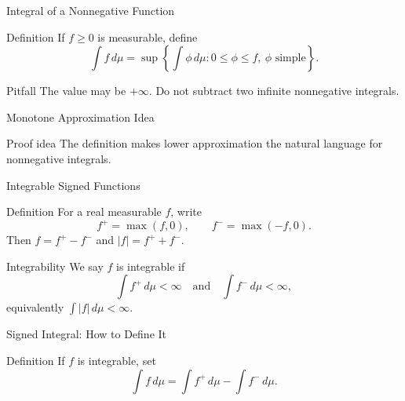\begin{frame}{Integral of a Nonnegative Function}
  \begin{block}{Definition}
    If $f\ge0$ is measurable, define
    \[
      \int f\,d\mu
      =
      \sup\left\{\int \phi\,d\mu:
      0\le \phi\le f,\ \phi\text{ simple}\right\}.
    \]
  \end{block}
  \begin{alertblock}{Pitfall}
    The value may be $+\infty$. Do not subtract two infinite nonnegative integrals.
  \end{alertblock}
\end{frame}

\begin{frame}{Monotone Approximation Idea}
  \begin{block}{Proof idea}
    The definition makes lower approximation the natural language for nonnegative integrals.
  \end{block}
\end{frame}

\begin{frame}{Integrable Signed Functions}
  \begin{block}{Definition}
    For a real measurable $f$, write
    \[
      f^+=\max(f,0),\qquad f^-=\max(-f,0).
    \]
    Then $f=f^+-f^-$ and $|f|=f^++f^-$.
  \end{block}
  \begin{block}{Integrability}
    We say $f$ is integrable if
    \[
      \int f^+\,d\mu<\infty
      \quad\text{and}\quad
      \int f^-\,d\mu<\infty,
    \]
    equivalently $\int |f|\,d\mu<\infty$.
  \end{block}
\end{frame}

\begin{frame}{Signed Integral: How to Define It}
  \begin{block}{Definition}
    If $f$ is integrable, set
    \[
      \int f\,d\mu
      =
      \int f^+\,d\mu-\int f^-\,d\mu.
    \]
  \end{block}
\end{frame}

